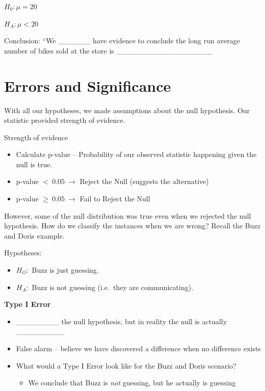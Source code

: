 \documentclass[
  letterpaper,
  DIV=11,
  numbers=noendperiod]{scrartcl}
\providecommand{\tightlist}{%
  \setlength{\itemsep}{0pt}\setlength{\parskip}{0pt}}
\begin{document}
\(H_{0}:\mu = 20\)

\(H_{A}:\mu < 20\)

Conclusion: ``We \_\_\_\_\_\_ have evidence to conclude the long run
average number of bikes sold at the store is
\_\_\_\_\_\_\_\_\_\_\_\_\_\_\_\_\_\_

\section{Errors and Significance}\label{errors-and-significance}

With all our hypotheses, we made assumptions about the null hypothesis.
Our statistic provided strength of evidence.

Strength of evidence

\begin{itemize}
\item
  Calculate p-value -- Probability of our observed statistic happening
  given the null is true.
\item
  p-value \(< \ 0.05\  \rightarrow\) Reject the Null (suggests the
  alternative)
\item
  p-value \(\geq \ 0.05\  \rightarrow\) Fail to Reject the Null
\end{itemize}

However, some of the null distribution was true even when we rejected
the null hypothesis. How do we classify the instances when we are wrong?
Recall the Buzz and Doris example.

Hypotheses:

\begin{itemize}
\item
  \(H_{O}:\) Buzz is just guessing.
\item
  \(H_{A}:\) Buzz is not guessing (i.e.~they are communicating).
\end{itemize}

\textbf{Type I Error}

\begin{itemize}
\item
  \_\_\_\_\_\_\_\_ the null hypothesis, but in reality the null is
  actually \_\_\_\_\_\_\_\_\_
\item
  False alarm -- believe we have discovered a difference when no
  difference exists
\item
  What would a Type I Error look like for the Buzz and Doris scenario?

  \begin{itemize}
  \tightlist
  \item
    We conclude that Buzz is \emph{not} guessing, but he actually is
    guessing
  \end{itemize}
\end{itemize}
\end{document}
